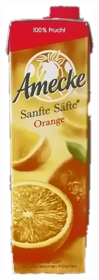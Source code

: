 \documentclass[a4paper,12pt,oneside]{article}
\begin{document}
\begin{figure}[htb]
\begin{minipage}[c]{0.08\textwidth}
\includegraphics[width=\textwidth]{Sources/Bild3_HA.png}

\end{minipage}
\end{figure}
\end{document}
